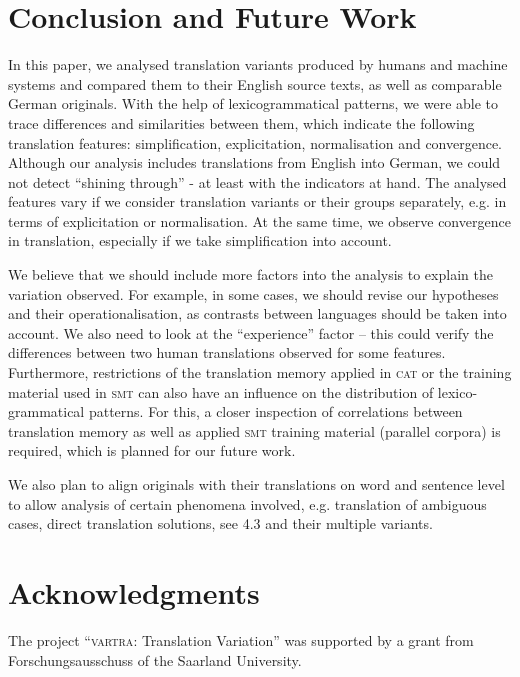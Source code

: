 \documentclass[output=paper]{LSP/langsci}
\begin{document}
\section{Conclusion and Future Work} \label{sec:4:5}

In this paper, we analysed translation variants produced by humans and machine systems and compared them to their English source texts, as well as comparable German originals. With the help of lexicogrammatical patterns, we were able to trace differences and similarities between them, which indicate the following translation features: simplification, explicitation, normalisation and convergence. Although our analysis includes translations from English into German, we could not detect “shining through” - at least with the indicators at hand. The analysed features vary if we consider translation variants or their groups separately, e.g. in terms of explicitation or normalisation. At the same time, we observe convergence in translation, especially if we take simplification into account.

We believe that we should include more factors into the analysis to explain the variation observed. For example, in some cases, we should revise our hypotheses and their operationalisation, as contrasts between languages should be taken into account. We also need to look at the “experience” factor – this could verify the differences between two human translations observed for some features. Furthermore, restrictions of the translation memory applied in \textsc{cat} or the training material used in \textsc{smt} can also have an influence on the distribution of lexico-grammatical patterns. For this, a closer inspection of correlations between translation memory as well as applied \textsc{smt} training material (parallel corpora) is required, which is planned for our future work.

We also plan to align originals with their translations on word and sentence level to allow analysis of certain phenomena involved, e.g. translation of ambiguous cases, direct translation solutions, see 4.3 and their multiple variants.

\section*{Acknowledgments}
The project “\textsc{vartra}: Translation Variation” was supported by a grant from Forschungsausschuss of the Saarland University.


\printbibliography[heading=subbibliography,notkeyword=this]
\end{document}
